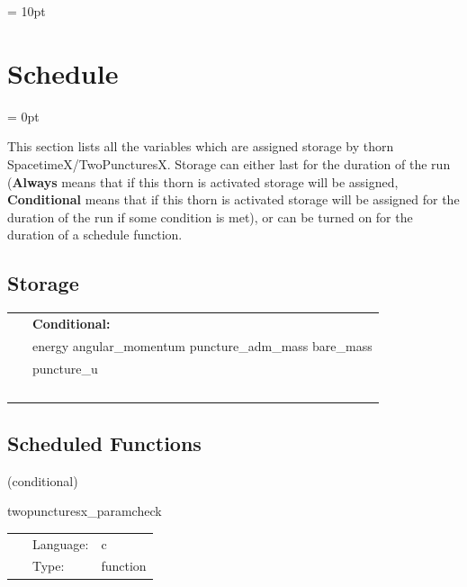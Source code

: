 \vspace{5mm}\parskip = 10pt 

\section{Schedule} 


\parskip = 0pt


\noindent This section lists all the variables which are assigned storage by thorn SpacetimeX/TwoPuncturesX.  Storage can either last for the duration of the run ({\bf Always} means that if this thorn is activated storage will be assigned, {\bf Conditional} means that if this thorn is activated storage will be assigned for the duration of the run if some condition is met), or can be turned on for the duration of a schedule function.


\subsection*{Storage}

\hspace{5mm}

 \begin{tabular*}{160mm}{ll} 
~& {\bf Conditional:} \\ 
~ &  energy angular\_momentum puncture\_adm\_mass bare\_mass\\ 
~ &  puncture\_u\\ 
~ & ~\\ 
\end{tabular*} 


\subsection*{Scheduled Functions}
\vspace{5mm}

   (conditional) 

\hspace{5mm} twopuncturesx\_paramcheck 

\hspace{5mm}{\it check parameters and thorn needs } 


\hspace{5mm}

 \begin{tabular*}{160mm}{cll} 
~ & Language:  & c \\ 
~ & Type:  & function \\ 
\end{tabular*} 


